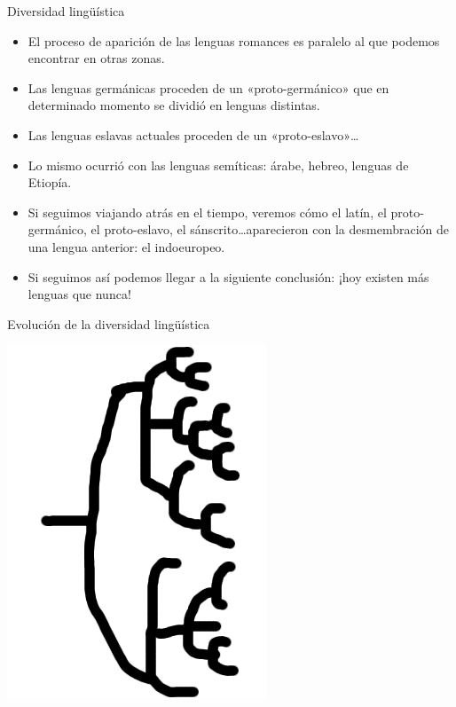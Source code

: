 \documentclass[handout]{beamer}
\begin{document}
\begin{frame}{Diversidad lingüística}
\begin{itemize}
	\item El proceso de aparición de las lenguas romances es paralelo al que podemos encontrar en otras zonas. 
	\item Las lenguas germánicas proceden de un «proto-germánico» que en determinado momento se dividió en lenguas distintas.
	\item Las lenguas eslavas actuales proceden de un «proto-eslavo»\ldots
	\item Lo mismo ocurrió con las lenguas semíticas: árabe, hebreo, lenguas de Etiopía.
	\item Si seguimos viajando atrás en el tiempo, veremos cómo el latín, el proto-germánico, el proto-eslavo, el sánscrito\ldots aparecieron con la desmembración de una lengua anterior: el indoeuropeo.
	\item Si seguimos así podemos llegar a la siguiente conclusión: ¡hoy existen más lenguas que nunca!
\end{itemize}
\end{frame}

\begin{frame}{Evolución de la diversidad lingüística}

\begin{center} 
  \includegraphics[scale=0.5]{img/diversidad-ling.png} 
\end{center}

\end{frame}
\end{document}
